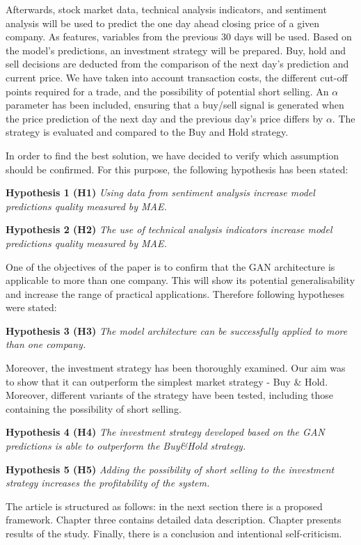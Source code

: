 \documentclass[11pt]{article} %
\begin{document}
Afterwards, stock market data, technical analysis indicators, and sentiment analysis will be used to predict the one day ahead closing price of a given company. As features, variables from the previous 30 days will be used. Based on the model's predictions, an investment strategy will be prepared. Buy, hold and sell decisions are deducted from the comparison of the next day's prediction and current price. We have taken into account transaction costs, the different cut-off points required for a trade, and the possibility of potential short selling. An $\alpha$ parameter has been included, ensuring that a buy/sell signal is generated when the price prediction of the next day and the previous day's price differs by $\alpha$. The strategy is evaluated and compared to the Buy and Hold strategy.

In order to find the best solution, we have decided to verify which assumption should be confirmed. For this purpose, the following hypothesis has been stated: 

\textbf{Hypothesis 1 (H1)} \textit{Using data from sentiment analysis increase model predictions quality measured by MAE.}

\textbf{Hypothesis 2 (H2)} \textit{The use of technical analysis indicators increase model predictions quality measured by MAE.}

One of the objectives of the paper is to confirm that the GAN architecture is applicable to more than one company. This will show its potential generalisability and increase the range of practical applications. Therefore following hypotheses were stated:

\textbf{Hypothesis 3 (H3)} \textit{The model architecture can be successfully applied to more than one company.}

Moreover, the investment strategy has been thoroughly examined. Our aim was to show that it can outperform the simplest market strategy - Buy \& Hold. Moreover, different variants of the strategy have been tested, including those containing the possibility of short selling. 

\textbf{Hypothesis 4 (H4)} \textit{The investment strategy developed based on the GAN predictions is able to outperform the Buy\&Hold strategy.} 

\textbf{Hypothesis 5 (H5)} \textit{Adding the possibility of short selling to the investment strategy increases the profitability of the system.}

The article is structured as follows: in the next section there is a proposed framework. Chapter three contains detailed data description. Chapter presents results of the study. Finally, there is a conclusion and intentional self-criticism.
\end{document}
